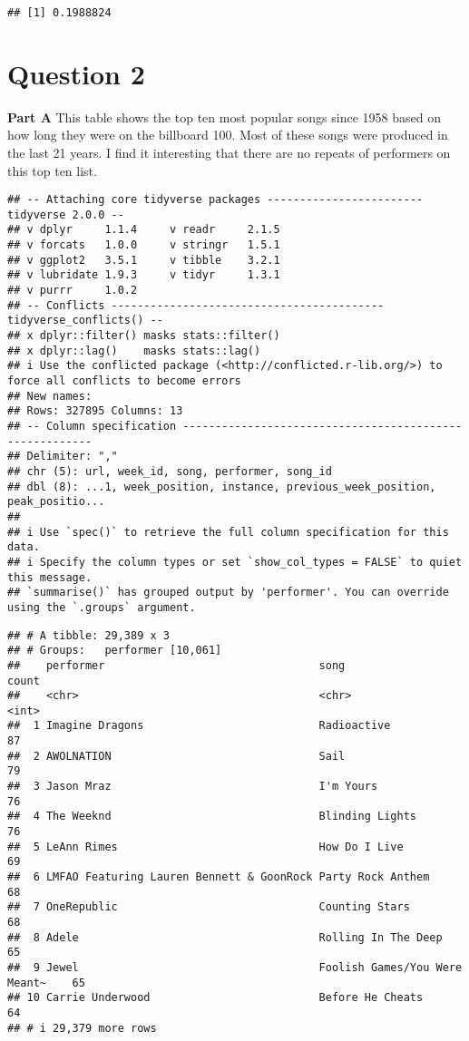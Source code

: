 \documentclass[
]{article}
\begin{document}
\begin{verbatim}
## [1] 0.1988824
\end{verbatim}

\section{Question 2}\label{question-2}

\textbf{Part A} This table shows the top ten most popular songs since
1958 based on how long they were on the billboard 100. Most of these
songs were produced in the last 21 years. I find it interesting that
there are no repeats of performers on this top ten list.

\begin{verbatim}
## -- Attaching core tidyverse packages ------------------------ tidyverse 2.0.0 --
## v dplyr     1.1.4     v readr     2.1.5
## v forcats   1.0.0     v stringr   1.5.1
## v ggplot2   3.5.1     v tibble    3.2.1
## v lubridate 1.9.3     v tidyr     1.3.1
## v purrr     1.0.2     
## -- Conflicts ------------------------------------------ tidyverse_conflicts() --
## x dplyr::filter() masks stats::filter()
## x dplyr::lag()    masks stats::lag()
## i Use the conflicted package (<http://conflicted.r-lib.org/>) to force all conflicts to become errors
## New names:
## Rows: 327895 Columns: 13
## -- Column specification --------------------------------------------------------
## Delimiter: ","
## chr (5): url, week_id, song, performer, song_id
## dbl (8): ...1, week_position, instance, previous_week_position, peak_positio...
## 
## i Use `spec()` to retrieve the full column specification for this data.
## i Specify the column types or set `show_col_types = FALSE` to quiet this message.
## `summarise()` has grouped output by 'performer'. You can override using the `.groups` argument.
\end{verbatim}

\begin{verbatim}
## # A tibble: 29,389 x 3
## # Groups:   performer [10,061]
##    performer                                 song                          count
##    <chr>                                     <chr>                         <int>
##  1 Imagine Dragons                           Radioactive                      87
##  2 AWOLNATION                                Sail                             79
##  3 Jason Mraz                                I'm Yours                        76
##  4 The Weeknd                                Blinding Lights                  76
##  5 LeAnn Rimes                               How Do I Live                    69
##  6 LMFAO Featuring Lauren Bennett & GoonRock Party Rock Anthem                68
##  7 OneRepublic                               Counting Stars                   68
##  8 Adele                                     Rolling In The Deep              65
##  9 Jewel                                     Foolish Games/You Were Meant~    65
## 10 Carrie Underwood                          Before He Cheats                 64
## # i 29,379 more rows
\end{verbatim}
\end{document}
